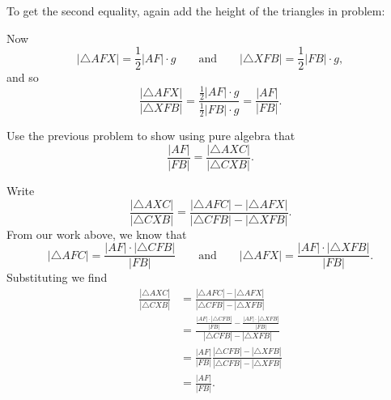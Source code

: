 \documentclass[newpage,hints,handout,nooutcomes,noauthor,12pt]{ximera}
\begin{document}
\begin{problem}
\begin{freeResponse}
To get the second equality, again add the height of the triangles in problem:
\begin{image}
\end{image}
Now 
\[
|\triangle AFX| = \frac{1}{2} |AF|\cdot g\qquad\text{and}\qquad |\triangle XFB| = \frac{1}{2} |FB|\cdot g,
\]
and so
\[
\frac{|\triangle AFX|}{|\triangle XFB|} = \frac{\frac{1}{2} |AF|\cdot g}{\frac{1}{2} |FB|\cdot g} = \frac{|AF|}{|FB|}.
\]
\end{freeResponse}
\end{problem}

\begin{problem}
\label{26} Use the previous problem to show using pure algebra that%
\[
\frac{|AF|}{|FB|}=\frac{|\triangle AXC|}{|\triangle CXB|}. %
\]
\begin{freeResponse}
Write
\[
\frac{|\triangle AXC|}{|\triangle CXB|} = \frac{|\triangle AFC|-|\triangle AFX|}{|\triangle CFB|-|\triangle XFB|}.
\]
From our work above, we know that
\[
|\triangle AFC| = \frac{|AF|\cdot |\triangle CFB|}{|FB|} \qquad\text{and}\qquad |\triangle AFX| = \frac{|AF|\cdot |\triangle XFB|}{|FB|}.
\]
Substituting we find
\begin{align*}
\frac{|\triangle AXC|}{|\triangle CXB|} &= \frac{|\triangle AFC|-|\triangle AFX|}{|\triangle CFB|-|\triangle XFB|}\\
&=\frac{ \frac{|AF|\cdot |\triangle CFB|}{|FB|}- \frac{|AF|\cdot |\triangle XFB|}{|FB|}}{|\triangle CFB|-|\triangle XFB|}\\
&=\frac{|AF|}{|FB|} \frac{|\triangle CFB|- |\triangle XFB|}{|\triangle CFB|-|\triangle XFB|}\\
&=\frac{|AF|}{|FB|}.
\end{align*}
\end{freeResponse}
\end{problem}
\end{document}
